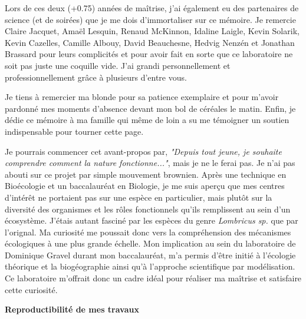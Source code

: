 
Lors de ces deux (+0.75) années de maîtrise, j'ai également eu des partenaires de science (et de
soirées) que je me dois d'immortaliser sur ce mémoire. Je remercie Claire Jacquet, Amaël Lesquin,
Renaud McKinnon, Idaline Laigle, Kevin Solarik, Kevin Cazelles, Camille Albouy, David Beauchesne,
Hedvig Nenzén et Jonathan Brassard pour leurs complicités et pour avoir fait en sorte que ce
laboratoire ne soit pas juste une coquille vide. J'ai grandi personnellement et professionnellement
grâce à plusieurs d'entre vous.

Je tiens à remercier ma blonde pour sa patience exemplaire et pour m'avoir pardonné mes moments
d'absence devant mon bol de céréales le matin. Enfin, je dédie ce mémoire à ma famille qui même de
loin a su me témoigner un soutien indispensable pour tourner cette page.


\avantpropos


Je pourrais commencer cet avant-propos par, \textit{"Depuis tout jeune, je souhaite comprendre
comment la nature fonctionne..."}, mais je ne le ferai pas. Je n'ai pas abouti sur ce projet par
simple mouvement brownien. Après une technique en Bioécologie et un baccalauréat en Biologie, je me
suis aperçu que mes centres d'intérêt ne portaient pas sur une espèce en particulier, mais plutôt
sur la diversité des organismes et les rôles fonctionnels qu'ils remplissent au sein d'un
écosystème. J'étais autant fasciné par les espèces du genre \textit{Lombricus sp.} que par
l'orignal. Ma curiosité me poussait donc vers la compréhension des mécanismes écologiques à une plus
grande échelle. Mon implication au sein du laboratoire de Dominique Gravel durant mon baccalauréat,
m'a permis d'être initié à l'écologie théorique et la biogéographie ainsi qu'à l'approche
scientifique par modélisation. Ce laboratoire m'offrait donc un cadre idéal pour réaliser ma
maîtrise et satisfaire cette curiosité.

\noindent\textbf{Reproductibilité de mes travaux}

